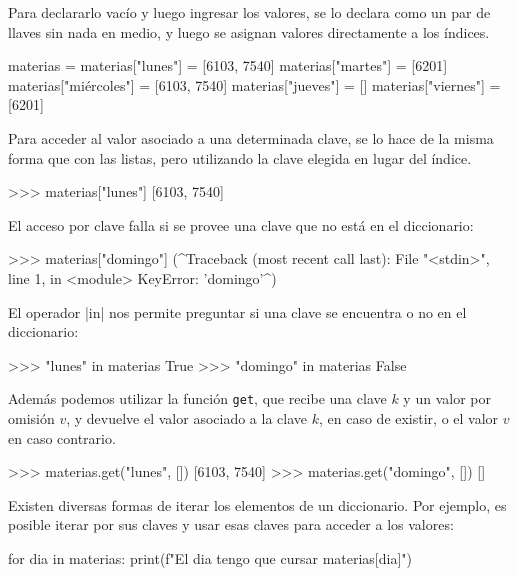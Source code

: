 Para declararlo vacío y luego ingresar los valores, se lo declara como un
par de llaves sin nada en medio, y luego se asignan valores directamente a
los índices.

\begin{codigo-python-sn}
materias = {}
materias["lunes"] = [6103, 7540]
materias["martes"] = [6201]
materias["miércoles"] = [6103, 7540]
materias["jueves"] = []
materias["viernes"] = [6201]
\end{codigo-python-sn}

Para acceder al valor asociado a una determinada clave, se lo hace
de la misma forma que con las listas, pero utilizando la clave
elegida en lugar del índice.

\begin{codigo-python-sn}
>>> materias["lunes"]
[6103, 7540]
\end{codigo-python-sn}

\begin{atencion}
El acceso por clave falla si se provee una clave que no está en el diccionario:

\begin{codigo-python-sn}
>>> materias["domingo"]
(^Traceback (most recent call last):
  File "<stdin>", line 1, in <module>
KeyError: 'domingo'^)
\end{codigo-python-sn}
\end{atencion}

El operador |in| nos permite preguntar si una clave se encuentra o no en el
diccionario:

\begin{codigo-python-sn}
>>> "lunes" in materias
True
>>> "domingo" in materias
False
\end{codigo-python-sn}

Además podemos utilizar la función \lstinline{get}, que recibe una
clave $k$ y un valor por omisión $v$, y devuelve el valor asociado a la clave
$k$, en caso de existir, o el valor $v$ en caso contrario.

\begin{codigo-python-sn}
>>> materias.get("lunes", [])
[6103, 7540]
>>> materias.get("domingo", [])
[]
\end{codigo-python-sn}

Existen diversas formas de iterar los elementos de un diccionario. Por ejemplo,
es posible iterar por sus claves y usar esas claves para acceder a los valores:

\begin{codigo-python-sn}
for dia in materias:
    print(f"El {dia} tengo que cursar {materias[dia]}")
\end{codigo-python-sn}

